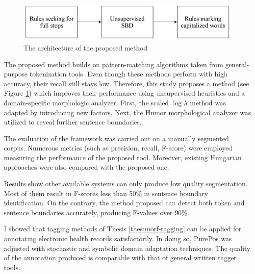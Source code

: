 \begin{figure}[H]
  \centering
  \includegraphics[scale=0.2]{Clinical/clin_segm_arch.png} 
  \caption{The architecture of the proposed method}
  \label{fig:clin-segment-arch_en}
\end{figure}

The proposed method builds on pattern-matching algorithms taken from general-purpose tokenization tools.
Even though these methods perform with high accuracy, their recall still stays low.
Therefore, this study proposes a method (see Figure \ref{fig:clin-segment-arch_en}) which improves their performance using unsupervised heuristics and a domain-specific morphologic analyzer.
First, the scaled $\log\lambda$  method \cite{kiss2006unsupervised} was adapted by introducing new factors.
Next, the Humor morphological analyzer was utilized to reveal further sentence boundaries.

The evaluation of the framework was carried out on a manually segmented corpus. 
Numerous metrics (such as precision, recall, F-score) were employed measuring the performance of the proposed tool.
Moreover, existing Hungarian approaches were also compared with the proposed one.

Results show other available systems can only produce low quality segmentation.
Most of them result in F-scores less than 50\% in sentence boundary identification.
On the contrary, the method proposed can detect both token and sentence boundaries accurately, producing F-values over 90\%.


\thesisline%

\begin{core}
\begin{thesis}%
\label{thes:clin-pos}
I showed that tagging methods of Thesis \ref{thes:morf-tagging} can be applied for annotating electronic health records satisfactorily.
In doing so, PurePos was adjusted with stochastic and symbolic domain adaptation techniques.
The quality of the annotation produced is comparable with that of general written tagger tools.
\end{thesis}

\begin{pub}
\cite{Orosz2013,Orosz2014b,Orosz2014x} 
\end{pub}
\end{core}

